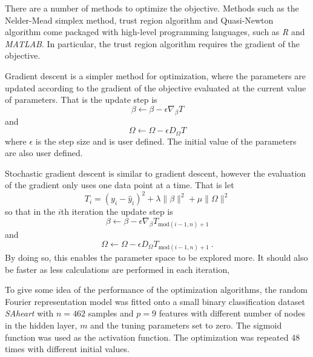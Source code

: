 \documentclass{article} %
\newcommand{\vectGreek}[1]{#1}
\newcommand{\matr}[1]{#1}
\begin{document}
There are a number of methods to optimize the objective. Methods such as the Nelder-Mead simplex method, trust region algorithm and Quasi-Newton algorithm come packaged with high-level programming languages, such as \emph{R} and \emph{MATLAB}. In particular, the trust region algorithm requires the gradient of the objective.

Gradient descent is a simpler method for optimization, where the parameters are updated according to the gradient of the objective evaluated at the current value of parameters. That is the update step is
\begin{equation}
\vectGreek{\beta} \leftarrow \vectGreek{\beta} - \epsilon \nabla_{\vectGreek{\beta}}T
\end{equation}
and
\begin{equation}
\matr{\Omega} \leftarrow \matr{\Omega} - \epsilon \matr{D_{\Omega}}T
\end{equation}
where $\epsilon$ is the step size and is user defined. The initial value of the parameters are also user defined.

Stochastic gradient descent is similar to gradient descent, however the evaluation of the gradient only uses one data point at a time. That is let
\begin{equation}
T_i =
\left(
	y_i-\hat{y}_i
\right)^2
+\lambda\|\vectGreek{\beta}\|^2
+\mu\|\matr{\Omega}\|^2
\end{equation}
so that in the $i$th iteration the update step is
\begin{equation}
\vectGreek{\beta} \leftarrow \vectGreek{\beta} - \epsilon \nabla_{\vectGreek{\beta}}T_{\text{mod}(i-1,n)+1}
\end{equation}
and
\begin{equation}
\matr{\Omega} \leftarrow \matr{\Omega} - \epsilon \matr{D_{\Omega}}T_{\text{mod}(i-1,n)+1} \ .
\end{equation}
By doing so, this enables the parameter space to be explored more. It should also be faster as less calculations are performed in each iteration,

To give some idea of the performance of the optimization algorithms, the random Fourier representation model was fitted onto a small binary classification dataset \emph{SAheart} with $n=462$ samples and $p=9$ features with different number of nodes in the hidden layer, $m$ and the tuning parameters set to zero. The sigmoid function was used as the activation function. The optimization was repeated 48 times with different initial values.
\end{document}
